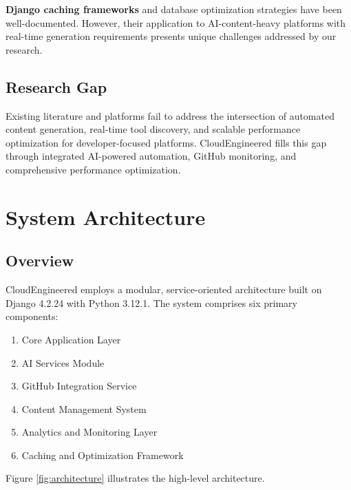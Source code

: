\documentclass[conference]{IEEEtran}
\begin{document}
\textbf{Django caching frameworks} \cite{django2024cache} and database optimization strategies have been well-documented. However, their application to AI-content-heavy platforms with real-time generation requirements presents unique challenges addressed by our research.

\subsection{Research Gap}

Existing literature and platforms fail to address the intersection of automated content generation, real-time tool discovery, and scalable performance optimization for developer-focused platforms. CloudEngineered fills this gap through integrated AI-powered automation, GitHub monitoring, and comprehensive performance optimization.

\section{System Architecture}

\subsection{Overview}

CloudEngineered employs a modular, service-oriented architecture built on Django 4.2.24 with Python 3.12.1. The system comprises six primary components:

\begin{enumerate}
    \item Core Application Layer
    \item AI Services Module
    \item GitHub Integration Service
    \item Content Management System
    \item Analytics and Monitoring Layer
    \item Caching and Optimization Framework
\end{enumerate}

Figure \ref{fig:architecture} illustrates the high-level architecture.
\end{document}
